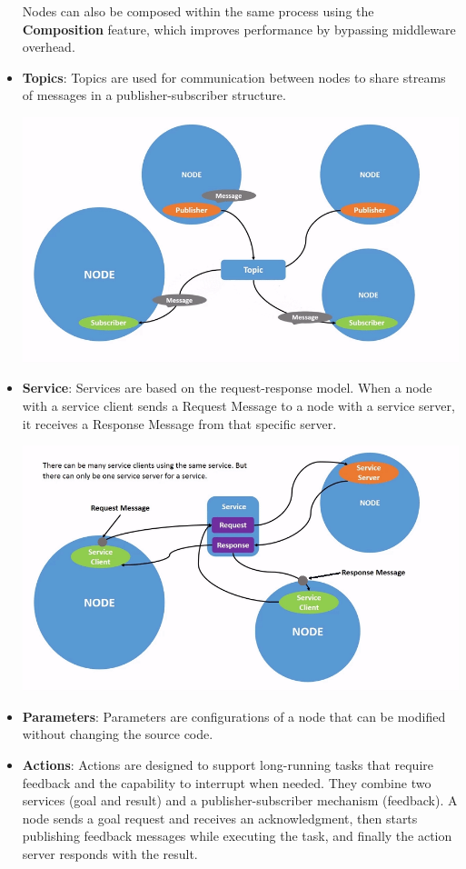 \begin{itemize}
	Nodes can also be composed within the same process using the \textbf{Composition}\label{Composition} feature, which improves performance by bypassing middleware overhead\cite{macenski2023impactros2node}.
	\item \textbf{Topics}: Topics are used for communication between nodes to share streams of messages in a publisher-subscriber structure.
	\begin{center}
		\captionsetup{type=figure}
		\includegraphics[width=0.6\linewidth]{img/Topic.png}
	\end{center}
	\item \textbf{Service}: Services are based on the request-response model. When a node with a service client sends a Request Message to a node with a service server, it receives a Response Message from that specific server.
	\begin{center}
		\captionsetup{type=figure}
		\includegraphics[width=0.6\linewidth]{img/Service.png}
	\end{center}
	\item \textbf{Parameters}: Parameters are configurations of a node that can be modified without changing the source code.
	\item \textbf{Actions}\label{Action}: Actions are designed to support long-running tasks that require feedback and the capability to interrupt when needed. They combine two services (goal and result) and a publisher-subscriber mechanism (feedback). A node sends a goal request and receives an acknowledgment, then starts publishing feedback messages while executing the task, and finally the action server responds with the result.

\end{itemize}
